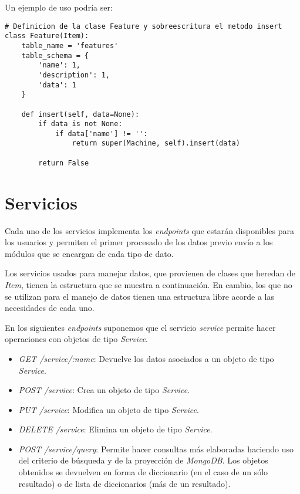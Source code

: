 \smallskip
Un ejemplo de uso podría ser:
\begin{lstlisting}
# Definicion de la clase Feature y sobreescritura el metodo insert
class Feature(Item):
	table_name = 'features'
	table_schema = {
		'name': 1,
		'description': 1,
		'data': 1
	}
	
	def insert(self, data=None):
		if data is not None:
			if data['name'] != '':
				return super(Machine, self).insert(data)
						
		return False
\end{lstlisting}

\section{Servicios}
\label{sec:servicios}

Cada uno de los servicios implementa los \textit{endpoints} que estarán disponibles para los usuarios y permiten el primer procesado de los datos previo envío a los módulos que se encargan de cada tipo de dato.

Los servicios usados para manejar datos, que provienen de clases que heredan de \textit{Item}, tienen la estructura que se muestra a continuación. En cambio, los que no se utilizan para el manejo de datos tienen una estructura libre acorde a las necesidades de cada uno.

\smallskip
{\scriptsize En los siguientes \textit{endpoints} suponemos que el servicio \textit{service} permite hacer operaciones con objetos de tipo \textit{Service}.}

\begin{itemize}
	\item \textit{GET /service/:name}: Devuelve los datos asociados a un objeto de tipo \textit{Service}.
	\item \textit{POST /service}: Crea un objeto de tipo \textit{Service}.
	\item \textit{PUT /service}: Modifica un objeto de tipo \textit{Service}.
	\item \textit{DELETE /service}: Elimina un objeto de tipo \textit{Service}.
	\item \textit{POST /service/query}: Permite hacer consultas más elaboradas haciendo uso del criterio de búsqueda y de la proyección de \textit{MongoDB}. Los objetos obtenidos se devuelven en forma de diccionario (en el caso de un sólo resultado) o de lista de diccionarios (más de un resultado).
\end{itemize}


